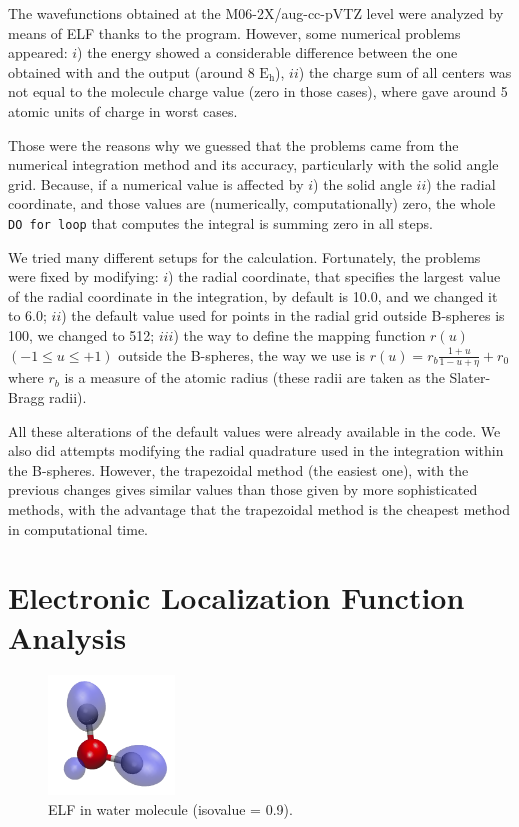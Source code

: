 The wavefunctions obtained at the M06-2X/aug-cc-pVTZ level were analyzed by
means of ELF thanks to the {} program.  However, some numerical
problems appeared: $i$) the energy showed a considerable difference between the
one obtained with {} and the {} output (around 8
$\mathrm{E_h}$), $ii$) the charge sum of all centers was not equal to the
molecule charge value (zero in those cases), where {} gave around 5
atomic units of charge in worst cases.

Those were the reasons why we guessed that the problems came from the numerical
integration method and its accuracy, particularly with the solid angle grid.
Because, if a numerical value is affected by $i$) the solid angle $ii$) the
radial coordinate, and those values are (numerically, computationally) zero,
the whole \texttt{DO for loop} that computes the integral is summing zero in
all steps.

We tried many different setups for the calculation.  Fortunately, the problems
were fixed by modifying:
$i$)
the radial coordinate, that specifies the largest value of the radial
coordinate in the integration, by default is 10.0, and we changed it to 6.0;
$ii$)
the default value used for points in the radial grid outside B-spheres is 100,
we changed to 512;
$iii$)
the way to define the mapping function $ r(u) $ $( -1 \leqslant u \leqslant +1
)$ outside the B-spheres, the way we use is $ r(u) = r_b \frac{1+u}{1 - u
+\eta} + r_0 $ where $r_b$ is a measure of the atomic radius (these radii are
taken as the Slater-Bragg radii).

All these alterations of the default values were already available in the code.
We also did attempts modifying the radial quadrature used in the integration
within the B-spheres. However, the trapezoidal method (the easiest one), with
the previous changes gives similar values than those given by more
sophisticated methods, with the advantage that the trapezoidal method is the
cheapest method in computational time.


\section{Electronic Localization Function Analysis}

\begin{figure} %
    \centering
    \includegraphics[width=0.3\textwidth]{4/plots/elf/new/waterELF.png}
    \caption{ELF in water molecule (isovalue = 0.9).}
    \label{awa}
\end{figure}

